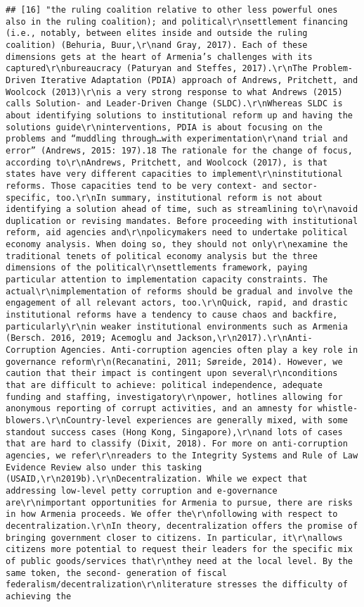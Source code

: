 \documentclass[
]{article}
\begin{document}
\begin{verbatim}
## [16] "the ruling coalition relative to other less powerful ones also in the ruling coalition); and political\r\nsettlement financing (i.e., notably, between elites inside and outside the ruling coalition) (Behuria, Buur,\r\nand Gray, 2017). Each of these dimensions gets at the heart of Armenia’s challenges with its captured\r\nbureaucracy (Paturyan and Steffes, 2017).\r\nThe Problem-Driven Iterative Adaptation (PDIA) approach of Andrews, Pritchett, and Woolcock (2013)\r\nis a very strong response to what Andrews (2015) calls Solution- and Leader-Driven Change (SLDC).\r\nWhereas SLDC is about identifying solutions to institutional reform up and having the solutions guide\r\ninterventions, PDIA is about focusing on the problems and “muddling through…with experimentation\r\nand trial and error” (Andrews, 2015: 197).18 The rationale for the change of focus, according to\r\nAndrews, Pritchett, and Woolcock (2017), is that states have very different capacities to implement\r\ninstitutional reforms. Those capacities tend to be very context- and sector-specific, too.\r\nIn summary, institutional reform is not about identifying a solution ahead of time, such as streamlining to\r\navoid duplication or revising mandates. Before proceeding with institutional reform, aid agencies and\r\npolicymakers need to undertake political economy analysis. When doing so, they should not only\r\nexamine the traditional tenets of political economy analysis but the three dimensions of the political\r\nsettlements framework, paying particular attention to implementation capacity constraints. The actual\r\nimplementation of reforms should be gradual and involve the engagement of all relevant actors, too.\r\nQuick, rapid, and drastic institutional reforms have a tendency to cause chaos and backfire, particularly\r\nin weaker institutional environments such as Armenia (Bersch. 2016, 2019; Acemoglu and Jackson,\r\n2017).\r\nAnti-Corruption Agencies. Anti-corruption agencies often play a key role in governance reform\r\n(Recanatini, 2011; Søreide, 2014). However, we caution that their impact is contingent upon several\r\nconditions that are difficult to achieve: political independence, adequate funding and staffing, investigatory\r\npower, hotlines allowing for anonymous reporting of corrupt activities, and an amnesty for whistle-blowers.\r\nCountry-level experiences are generally mixed, with some standout success cases (Hong Kong, Singapore),\r\nand lots of cases that are hard to classify (Dixit, 2018). For more on anti-corruption agencies, we refer\r\nreaders to the Integrity Systems and Rule of Law Evidence Review also under this tasking (USAID,\r\n2019b).\r\nDecentralization. While we expect that addressing low-level petty corruption and e-governance are\r\nimportant opportunities for Armenia to pursue, there are risks in how Armenia proceeds. We offer the\r\nfollowing with respect to decentralization.\r\nIn theory, decentralization offers the promise of bringing government closer to citizens. In particular, it\r\nallows citizens more potential to request their leaders for the specific mix of public goods/services that\r\nthey need at the local level. By the same token, the second- generation of fiscal federalism/decentralization\r\nliterature stresses the difficulty of achieving the 
\end{verbatim}
\end{document}
